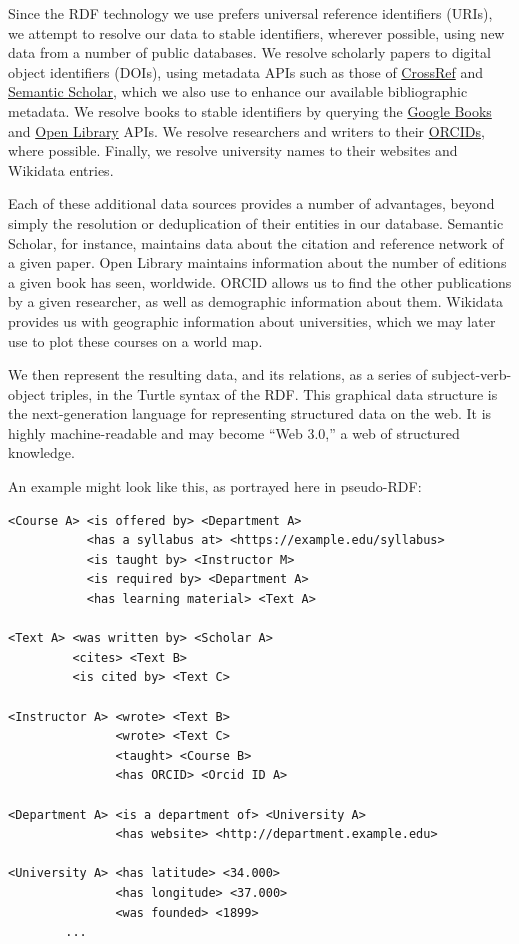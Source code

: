 \documentclass[
]{article}
\begin{document}
Since the RDF technology we use prefers universal reference identifiers
(URIs), we attempt to resolve our data to stable identifiers, wherever
possible, using new data from a number of public databases. We resolve
scholarly papers to digital object identifiers (DOIs), using metadata
APIs such as those of \href{https://www.crossref.org/}{CrossRef} and
\href{https://www.semanticscholar.org/}{Semantic Scholar}, which we also
use to enhance our available bibliographic metadata. We resolve books to
stable identifiers by querying the
\href{https://books.google.com/}{Google Books} and
\href{https://openlibrary.org/}{Open Library} APIs. We resolve
researchers and writers to their \href{https://orcid.org/}{ORCIDs},
where possible. Finally, we resolve university names to their websites
and Wikidata entries.

Each of these additional data sources provides a number of advantages,
beyond simply the resolution or deduplication of their entities in our
database. Semantic Scholar, for instance, maintains data about the
citation and reference network of a given paper. Open Library maintains
information about the number of editions a given book has seen,
worldwide. ORCID allows us to find the other publications by a given
researcher, as well as demographic information about them. Wikidata
provides us with geographic information about universities, which we may
later use to plot these courses on a world map.

We then represent the resulting data, and its relations, as a series of
subject-verb-object triples, in the Turtle syntax of the RDF. This
graphical data structure is the next-generation language for
representing structured data on the web. It is highly machine-readable
and may become ``Web 3.0,'' a web of structured knowledge.

An example might look like this, as portrayed here in pseudo-RDF:

\begin{verbatim}
<Course A> <is offered by> <Department A>
           <has a syllabus at> <https://example.edu/syllabus>
           <is taught by> <Instructor M>
           <is required by> <Department A>
           <has learning material> <Text A>

<Text A> <was written by> <Scholar A>
         <cites> <Text B> 
         <is cited by> <Text C> 

<Instructor A> <wrote> <Text B>
               <wrote> <Text C>
               <taught> <Course B>
               <has ORCID> <Orcid ID A>

<Department A> <is a department of> <University A>
               <has website> <http://department.example.edu>

<University A> <has latitude> <34.000>
               <has longitude> <37.000>
               <was founded> <1899>
        ...
\end{verbatim}
\end{document}
